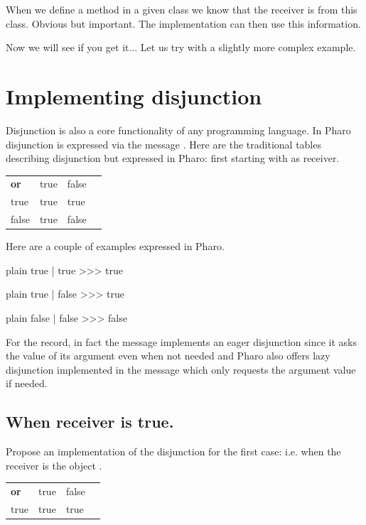 \documentclass[10pt,twoside,english]{_support/latex/sbabook/sbabook}
\begin{document}
\begin{note}
When we define a method in a given class we know that the receiver is from this class. Obvious but important. The implementation can then use this information.
\end{note}

Now we will see if you get it... Let us try with a slightly more complex example.
\section{Implementing disjunction}
Disjunction is also a core functionality of any programming language. In Pharo disjunction is expressed via the message \textcode{\textbar{}}. 
 Here are the traditional tables describing disjunction but expressed in Pharo: first starting with  as receiver.

\begin{tabular}{llll}
\toprule
\textbf{or} & true & false &  \\
true & true & true &  \\
false & true & false &  \\
\bottomrule
\end{tabular}

Here are a couple of examples expressed in Pharo. 

\begin{displaycode}{plain}
true | true
>>> true
\end{displaycode}

\begin{displaycode}{plain}
true | false 
>>> true
\end{displaycode}

\begin{displaycode}{plain}
false | false 
>>> false
\end{displaycode}

For the record, in fact the message \textcode{\textbar{}} implements an eager disjunction since it asks the value of its argument even when not needed and Pharo also offers lazy disjunction implemented in the message  which only requests the argument value if needed.
\subsection{When receiver is true.}
Propose an implementation of the disjunction for the first case: i.e. when the receiver is the object .

\begin{tabular}{llll}
\toprule
\textbf{or} & true & false &  \\
true & true & true &  \\
\bottomrule
\end{tabular}
\end{document}
